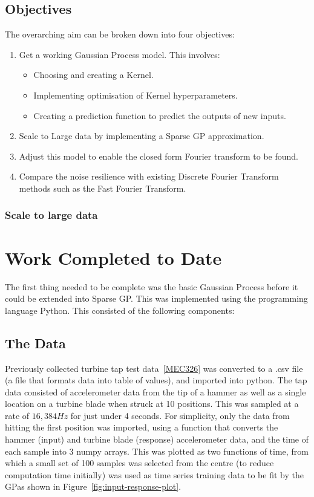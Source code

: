 \documentclass[12pt]{article}
\begin{document}
    \subsection{Objectives}
    The overarching aim can be broken down into four objectives:
        \begin{enumerate}
            \item Get a working Gaussian Process model.
            This involves:
                \begin{itemize}
                    \item Choosing and creating a Kernel.
                    \item Implementing optimisation of Kernel hyperparameters. \label{item:nll}
                    \item Creating a prediction function to predict the outputs of new inputs. \label{item:predict}
                \end{itemize}
            \item Scale to Large data by implementing a Sparse GP approximation.
            \item Adjust this model to enable the closed form Fourier transform to be found.
            \item Compare the noise resilience with existing Discrete Fourier Transform methods such as the Fast Fourier Transform.
        \end{enumerate}

    \subsubsection{Scale to large data}

    \section{Work Completed to Date}
    The first thing needed to be complete was the basic Gaussian Process before it could be extended into Sparse GP\@.
    This was implemented using the programming language Python.
    This consisted of the following components:
    \subsection{The Data}
    Previously collected turbine tap test data~\ref{MEC326} was converted to a .csv file (a file that formats data into table of values), and imported into python.
    The tap data consisted of accelerometer data from the tip of a hammer as well as a single location on a turbine blade when struck at 10 positions.
    This was sampled at a rate of $16,384 Hz$ for just under 4 seconds.
    For simplicity, only the data from hitting the first position was imported, using a function that converts the hammer (input) and turbine blade (response) accelerometer data, and the time of each sample into 3 numpy arrays.
    This was plotted as two functions of time, from which a small set of 100 samples was selected from the centre (to reduce computation time initially) was used as time series training data to be fit by the GP\@ as shown in Figure~\ref{fig:input-response-plot}.
\end{document}
